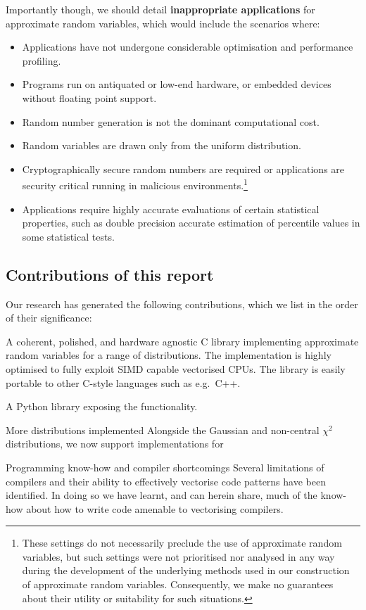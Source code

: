 Importantly though, we should detail \textbf{inappropriate applications} for approximate random variables, which would include the scenarios where:
\begin{itemize}
\item Applications have not undergone considerable optimisation and performance profiling. 

\item Programs run on antiquated or low-end hardware, or embedded devices without floating point support. 

\item Random number generation is not the dominant computational cost. 

\item Random variables are drawn only from the uniform distribution. 

\item Cryptographically secure random numbers are required or applications are security critical running in malicious environments.\footnote{These settings do not necessarily preclude the use of approximate random variables, but such settings were not prioritised nor analysed in any way during the development of the underlying methods used in our construction of approximate random variables. Consequently, we make no guarantees about their utility or suitability for such situations.}

\item Applications require highly accurate evaluations of certain statistical properties, such as double precision accurate estimation of percentile values in some statistical tests. 
\end{itemize}


\subsection{Contributions of this report}

Our research has generated the following contributions, which we list in the order of their significance:
\begin{longdescription}
\item[\arv] A coherent, polished, and hardware agnostic C library implementing approximate random variables for a range of distributions. The implementation is highly optimised to fully exploit SIMD capable vectorised CPUs. The library is easily portable to other C-style languages such as e.g.\ C++.  
\item[\pyarv] A Python library exposing the \arv functionality. 
\item[More distributions implemented] Alongside the Gaussian and non-central \( \chi^2 \) distributions, we now support implementations for  
\item[Programming know-how and compiler shortcomings] Several limitations of compilers and their ability to effectively vectorise code patterns have been identified. In doing so we have learnt, and can herein share, much of the know-how about how to write code amenable to vectorising compilers. 
\end{longdescription}


